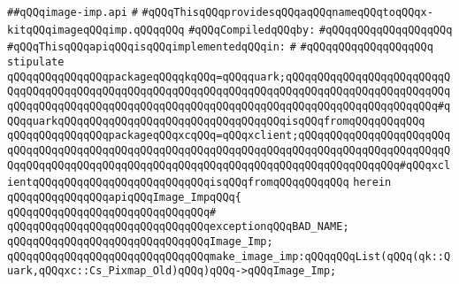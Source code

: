 \label{src/lib/x-kit/widget/lib/image-imp.api}
\verb|##qQQqimage-imp.api|\newline
\verb|#|\newline
\verb|#qQQqThisqQQqprovidesqQQqaqQQqnameqQQqtoqQQqx-kitqQQqimageqQQqimp.qQQqqQQq|\newline
\newline
\verb|#qQQqCompiledqQQqby:|\newline
\verb|#qQQqqQQqqQQqqQQqqQQq|\newline
\newline
\verb|#qQQqThisqQQqapiqQQqisqQQqimplementedqQQqin:|\newline
\verb|#|\newline
\verb|#qQQqqQQqqQQqqQQqqQQq|\newline
\newline
\verb|stipulate|\newline
\verb|qQQqqQQqqQQqqQQqpackageqQQqqkqQQq=qQQqquark;qQQqqQQqqQQqqQQqqQQqqQQqqQQqqQQqqQQqqQQqqQQqqQQqqQQqqQQqqQQqqQQqqQQqqQQqqQQqqQQqqQQqqQQqqQQqqQQqqQQqqQQqqQQqqQQqqQQqqQQqqQQqqQQqqQQqqQQqqQQqqQQqqQQqqQQqqQQqqQQqqQQq#qQQqquarkqQQqqQQqqQQqqQQqqQQqqQQqqQQqqQQqqQQqisqQQqfromqQQqqQQqqQQq|\newline
\verb|qQQqqQQqqQQqqQQqpackageqQQqxcqQQq=qQQqxclient;qQQqqQQqqQQqqQQqqQQqqQQqqQQqqQQqqQQqqQQqqQQqqQQqqQQqqQQqqQQqqQQqqQQqqQQqqQQqqQQqqQQqqQQqqQQqqQQqqQQqqQQqqQQqqQQqqQQqqQQqqQQqqQQqqQQqqQQqqQQqqQQqqQQqqQQqqQQq#qQQqxclientqQQqqQQqqQQqqQQqqQQqqQQqqQQqisqQQqfromqQQqqQQqqQQq|\newline
\verb|herein|\newline
\newline
\verb|qQQqqQQqqQQqqQQqapiqQQqImage_ImpqQQq{|\newline
\verb|qQQqqQQqqQQqqQQqqQQqqQQqqQQqqQQq#|\newline
\verb|qQQqqQQqqQQqqQQqqQQqqQQqqQQqqQQqexceptionqQQqBAD_NAME;|\newline
\newline
\verb|qQQqqQQqqQQqqQQqqQQqqQQqqQQqqQQqImage_Imp;|\newline
\newline
\verb|qQQqqQQqqQQqqQQqqQQqqQQqqQQqqQQqmake_image_imp:qQQqqQQqList(qQQq(qk::Quark,qQQqxc::Cs_Pixmap_Old)qQQq)qQQq->qQQqImage_Imp;|\newline
